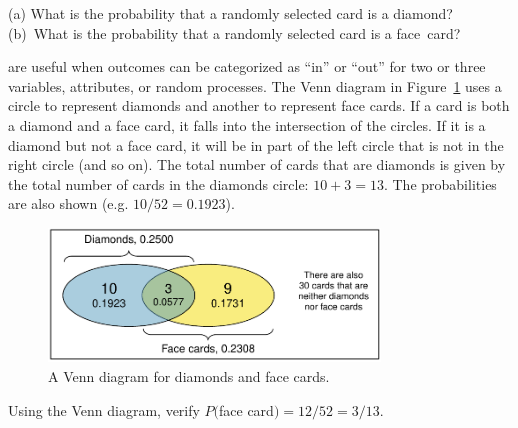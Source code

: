 \begin{exercisewrap}
\begin{nexercise}
(a) What is the probability that a randomly selected card is a diamond? (b)~What is the probability that a randomly selected card is a face~card?\footnotemark
\end{nexercise}
\end{exercisewrap}

 are useful when outcomes can be categorized as ``in'' or ``out'' for two or three variables, attributes, or random processes. The Venn diagram in Figure~\ref{venn} uses a circle to represent diamonds and another to represent face cards. If a card is both a diamond and a face card, it falls into the intersection of the circles. If it is a diamond but not a face card, it will be in part of the left circle that is not in the right circle (and so on). The total number of cards that are diamonds is given by the total number of cards in the diamonds circle: $10+3=13$. The probabilities are also shown (e.g. $10/52 = 0.1923$).

\begin{figure}
\centering
\includegraphics[height=1.4in]{ch_probability/figures/venn/venn}
\caption{A Venn diagram for diamonds and face cards.}
\label{venn}
\end{figure}

\D{\newpage}

\begin{exercisewrap}
\begin{nexercise}
Using the Venn diagram, verify $P($face card$) = 12/52=3/13$.\footnotemark\end{nexercise}
\end{exercisewrap}


